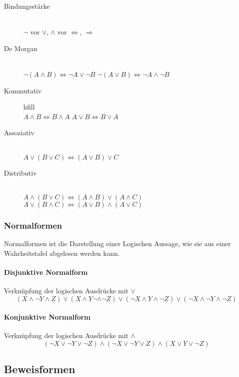 \begin{multicols}{2}
\begin{description}
		\item[Bindungsstärke] \hfill \\$\neg$ vor $\lor$, $\land$ vor $\Leftrightarrow$, $\Rightarrow$
		\item[De Morgan]\hfill \\ $\neg (A \land B) \Leftrightarrow \neg A \lor \neg B$ \newline $\neg (A \lor B) \Leftrightarrow \neg A \land \neg B$
		\item[Kommutativ] hfill \\ $A \land B \Leftrightarrow B \land A$ $A \lor B \Leftrightarrow B \lor A$
		\item[Assoziativ] \hfill \\ $A \lor (B \lor C) \Leftrightarrow (A \lor B) \lor C$
		\item[Distributiv] \hfill \\ $A \land (B \lor C) \Leftrightarrow (A \land B) \lor (A \land C)$ \newline $A \lor (B \land C) \Leftrightarrow (A \lor B) \land (A \lor C)$ 

	\end{description}


\subsubsection{Normalformen}
	Normalformen ist die Darstellung einer Logischen Aussage, wie sie aus einer Wahrheitstafel abgelesen werden kann.
	
	\paragraph{Disjunktive Normalform}
		
		Verknüpfung der logischen Ausdrücke mit $\lor$
		\[
			(X \land \neg Y \land Z) \lor
			(X \land Y \neg \land \neg Z) \lor
			(\neg X \land Y \land \neg Z) \lor
			(\neg X \land \neg Y \land \neg Z)
		\]
	
	\paragraph{Konjunktive Normalform}
		
		Verknüpfung der logischen Ausdrücke mit $\land$
		\[
			(\neg X \lor \neg Y \lor \neg Z) \land
			(\neg X \lor \neg Y \lor Z) \land
			(X \lor Y \lor \neg Z)
		\]
		
		

\subsection{Beweisformen}


\end{multicols}
